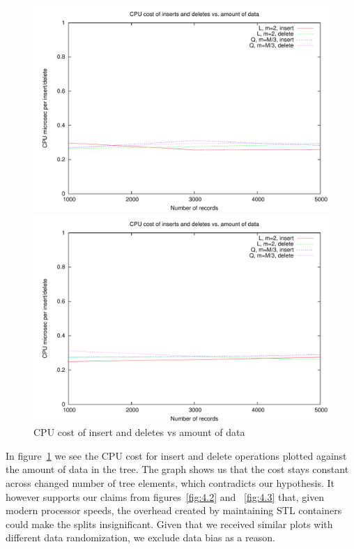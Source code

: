 \begin{figure}
\centering
\begin{minipage}{0.49\textwidth}
\centering
\includegraphics[width=\textwidth]{fig/random/figure-4-7.pdf}
\end{minipage}
\begin{minipage}{0.49\textwidth}
\centering
\includegraphics[width=\textwidth]{fig/usppp/figure-4-7.pdf}
\end{minipage}
\caption{CPU cost of insert and deletes vs amount of data}
\label{fig:4.7}
\end{figure}

In figure~\ref{fig:4.7} we see the CPU cost for insert and delete operations plotted against the amount of data in the tree. The graph shows us that the cost stays constant across changed number of tree elements, which contradicts our hypothesis. It however supports our claims from figures~\ref{fig:4.2} and ~\ref{fig:4.3} that, given modern processor speeds, the overhead created by maintaining STL containers could make the splits insignificant. Given that we received similar plots with different data randomization, we exclude data bias as a reason.

